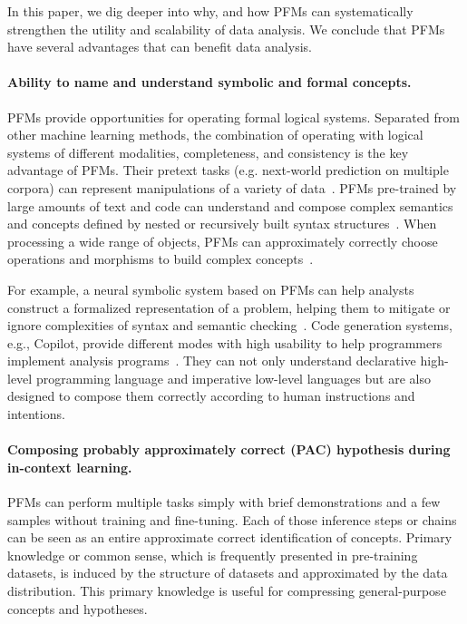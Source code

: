   In this paper, we dig deeper into why, and how PFMs can systematically strengthen the utility and scalability of data analysis. We conclude that PFMs have several advantages that can benefit data analysis. 
  
  \paragraph{Ability to name and understand symbolic and formal concepts.} PFMs provide opportunities for operating formal logical systems. Separated from other machine learning methods, the combination of operating with logical systems of different modalities, completeness, and consistency is the key advantage of PFMs. Their pretext tasks (e.g. next-world prediction on multiple corpora) can represent manipulations of a variety of data~\cite{yuan2023power}. PFMs pre-trained by large amounts of text and code can understand and compose complex semantics and concepts defined by nested or recursively built syntax structures~\cite{phi1}. When processing a wide range of objects, PFMs can approximately correctly choose operations and morphisms to build complex concepts~\cite{009brown2020language}. 
  
  For example, a neural symbolic system based on PFMs can help analysts construct a formalized representation of a problem, helping them to mitigate or ignore complexities of syntax and semantic checking~\cite{Bavishi2022NeurosymbolicRF}. Code generation systems, e.g., Copilot, provide different modes with high usability to help programmers implement analysis programs~\cite{Barke2022GroundedCH}. They can not only understand declarative high-level programming language and imperative low-level languages but are also designed to compose them correctly according to human instructions and intentions. 
  
  \paragraph{Composing probably approximately correct (PAC) hypothesis during in-context learning.} PFMs can perform multiple tasks simply with brief demonstrations and a few samples without training and fine-tuning. Each of those inference steps or chains can be seen as an entire approximate correct identification of concepts. Primary knowledge or common sense, which is frequently presented in pre-training datasets, is induced by the structure of datasets and approximated by the data distribution. This primary knowledge is useful for compressing general-purpose concepts and hypotheses. 
  
